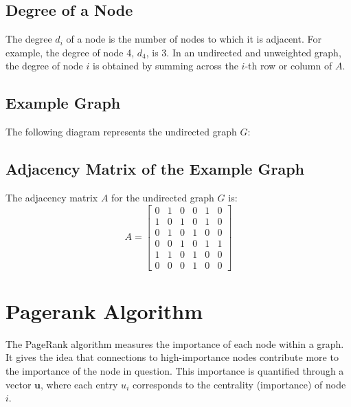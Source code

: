 \subsection*{Degree of a Node}
The degree \( d_i \) of a node is the number of nodes to which it is adjacent. For example, the degree of node 4, \( d_4 \), is 3. In an undirected and unweighted graph, the degree of node \( i \) is obtained by summing across the \( i \)-th row or column of \( A \).

\subsection*{Example Graph}
The following diagram represents the undirected graph \( G \):

\begin{center}
\end{center}

\subsection*{Adjacency Matrix of the Example Graph}
The adjacency matrix \( A \) for the undirected graph \( G \) is:
\[ A = \begin{bmatrix}
0 & 1 & 0 & 0 & 1 & 0 \\
1 & 0 & 1 & 0 & 1 & 0 \\
0 & 1 & 0 & 1 & 0 & 0 \\
0 & 0 & 1 & 0 & 1 & 1 \\
1 & 1 & 0 & 1 & 0 & 0 \\
0 & 0 & 0 & 1 & 0 & 0
\end{bmatrix} \]
\section{Pagerank Algorithm}
The PageRank algorithm measures the importance of each node within a graph. It gives the idea that connections to high-importance nodes contribute more to the importance of the node in question. This importance is quantified through a vector \( \mathbf{u} \), where each entry \( u_i \) corresponds to the centrality (importance) of node \( i \).


